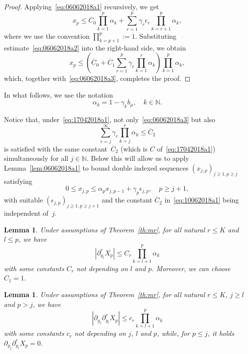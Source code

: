 \documentclass[article]{elsarticle}
\newtheorem{lem}[thm]{Lemma}
\newcommand*{\ol}{\overline}
\begin{document}
\begin{proof}
Applying~\eqref{eq:06062018a1} recursively, we get
$$
x_p\le\ol C_0\prod_{k=1}^p \alpha_k
+\sum_{r=1}^p \gamma_r\epsilon_r
\prod_{k=r+1}^p \alpha_k,
$$
where we use the convention $\prod_{k=p+1}^p:=1$.
Substituting estimate~\eqref{eq:06062018a2}
into the right-hand side, we obtain
$$
x_p\le\left(\ol C_0+\ol C_1
\sum_{r=1}^p \gamma_r \prod_{k=1}^r \alpha_k
\right)
\prod_{k=1}^p \alpha_k,
$$
which, together with~\eqref{eq:06062018a3}, completes the proof.
\end{proof}

In what follows, we use the notation
$$
\alpha_k=1-\gamma_k b_\mu,\quad k\in\mathbb N.
$$

\begin{remark}\label{rem:10062018a1}
Notice that, under~\eqref{eq:17042018a1},
not only~\eqref{eq:06062018a3} but also
\begin{equation}\label{eq:10062018a1}
\sum_{r=j}^\infty\gamma_r \prod_{k=j}^r \alpha_k\le\ol C_2
\end{equation}
is satisfied with the same constant~$\ol C_2$
(which is $C$ of~\eqref{eq:17042018a1})
simultaneously for all $j\in\mathbb N$.
Below this will allow us to apply
Lemma~\ref{lem:06062018a1}
to bound double indexed sequences
$(x_{j,p})_{j\ge1,p\ge j}$
satisfying
$$
0\le x_{j,p}\le\alpha_p x_{j,p-1}+\gamma_p \epsilon_{j,p},\quad p\ge j+1,
$$
with suitable $(\epsilon_{j,p})_{j\ge1,p\ge j+1}$
and the constant $\ol C_2$ in~\eqref{eq:10062018a1}
being independent of~$j$.
\end{remark}

\begin{lem}\label{lem:06062018a2}
Under assumptions of Theorem~\ref{th:mr},
for all natural $r\le K$ and $l\le p$, we have
\begin{equation}\label{eq:08062018b2}
\left|\partial_{y_l}^r X_p\right|
\le C_r\prod_{k=l+1}^p \alpha_k
\end{equation}
with some constants $C_r$
not depending on $l$ and $p$.
Moreover, we can choose $C_1=1$.
\end{lem}

\begin{lem}\label{lem:06062018a3}
Under assumptions of Theorem~\ref{th:mr},
for all natural $r\le K$, $j\ge l$ and $p>j$, we have
\begin{equation}\label{eq:08062018b3}
\left|\partial_{y_j} \partial_{y_l}^r X_p\right|
\le c_r\prod_{k=l+1}^p \alpha_k
\end{equation}
with some constants $c_r$
not depending on $j$, $l$ and $p$,
while, for $p\le j$, it holds
$\partial_{y_{j}}\partial_{y_{l}}^{r}X_{p}=0$.
\end{lem}
\end{document}
